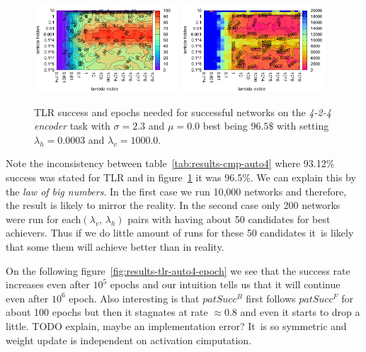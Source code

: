\begin{figure}[H]
  \centering
  \includegraphics[width=0.48\textwidth]{img/tlr-auto4-success.pdf}   
  \includegraphics[width=0.48\textwidth]{img/tlr-auto4-epoch.pdf}     
  \caption{TLR success and epochs needed for successful networks on the \emph{4-2-4 encoder} task with $\sigma = 2.3$ and $\mu = 0.0$ best being $96.5\$$ with setting $\lambda_h=0.0003$ and $\lambda_v=1000.0$.}
  \label{fig:results-tlr-auto4-performance}
\end{figure}

Note the inconsistency between table~\ref{tab:results-cmp-auto4} where 93.12\% success was stated for TLR and in figure~\ref{fig:results-tlr-auto4-performance} it was 96.5\%. We can explain this by the \emph{law of big numbers}. In the first case we run 10,000 networks and therefore, the result is likely to mirror the reality. In the second case only 200 networks were run for each$(\lambda_v,\,\lambda_h)$ pairs with having about 50 candidates for best achievers. Thus if we do little amount of runs for these 50 candidates it~is likely that some them will achieve better than in reality. 

On the following figure~\ref{fig:results-tlr-auto4-epoch} we see that the success rate increases even after $10^5$ epochs and our intuition tells us that it will continue even after $10^6$ epoch. Also interesting is that $patSucc^B$ first follows $patSucc^F$ for about 100 epochs but then it stagnates at rate $\approx0.8$ and even it starts to drop a little. TODO explain, maybe an implementation error? It~is so symmetric and weight update is independent on activation cimputation. 

